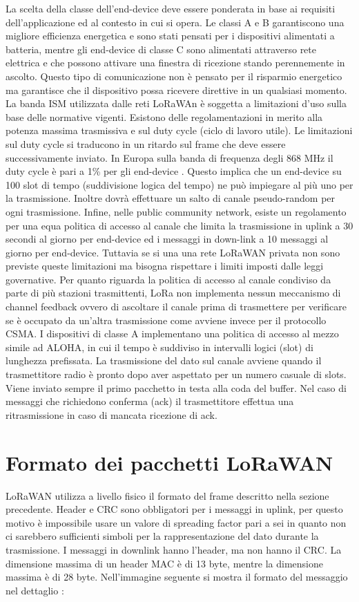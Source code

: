 \documentclass[12pt,a4paper,openright,twoside]{report}
\begin{document}
La scelta della classe dell'end-device deve essere ponderata in base ai requisiti dell'applicazione ed al contesto in cui si opera. Le classi A e B garantiscono una migliore efficienza energetica e sono stati pensati per i dispositivi alimentati a batteria, mentre gli end-device di classe C sono alimentati attraverso rete elettrica e che possono attivare una finestra di ricezione stando perennemente in ascolto. Questo tipo di comunicazione non \`e pensato per il risparmio energetico ma garantisce che il dispositivo possa ricevere direttive in un qualsiasi momento. 
La banda ISM utilizzata dalle reti LoRaWAn \`e soggetta a limitazioni d'uso sulla base delle normative vigenti. Esistono delle regolamentazioni in merito alla potenza massima trasmissiva e sul duty cycle (ciclo di lavoro utile). Le limitazioni sul duty cycle si traducono in un ritardo sul frame che deve essere successivamente inviato. 
In Europa sulla banda di frequenza degli 868 MHz il duty cycle \`e pari a 1\% per gli end-device \cite{K27}.  Questo implica che un end-device su 100 slot di tempo (suddivisione logica del tempo) ne pu\`o impiegare al pi\`u uno per la trasmissione. Inoltre dovr\`a effettuare un salto di canale pseudo-random per ogni trasmissione. Infine, nelle public community network, esiste un regolamento per una equa politica di accesso al canale che limita la trasmissione in uplink a 30 secondi al giorno per end-device ed i messaggi in down-link a 10 messaggi al giorno per end-device. Tuttavia se si una una rete LoRaWAN privata non sono previste queste limitazioni ma bisogna rispettare i limiti imposti dalle leggi governative. 
Per quanto riguarda la politica di accesso al canale condiviso da parte di pi\`u stazioni trasmittenti, LoRa non implementa nessun meccanismo di channel feedback ovvero di ascoltare il canale prima di trasmettere per verificare se \`e occupato da un'altra trasmissione come avviene invece per il protocollo CSMA. I dispositivi di classe A implementano una politica di accesso al mezzo simile ad ALOHA, in cui il tempo \`e suddiviso in intervalli logici (slot) di lunghezza prefissata. La trasmissione del dato sul canale avviene quando il trasmettitore radio \`e pronto dopo aver aspettato per un numero casuale di slots. Viene inviato sempre il primo pacchetto in testa alla coda del buffer. Nel caso di messaggi che richiedono conferma (ack) il trasmettitore effettua una ritrasmissione in caso di mancata ricezione di ack.  

\section{Formato dei pacchetti LoRaWAN}
LoRaWAN utilizza a livello fisico il formato del frame descritto nella sezione precedente. Header e CRC sono obbligatori per i messaggi in uplink, per questo motivo \`e impossibile usare un valore di spreading factor pari a sei in quanto non ci sarebbero sufficienti simboli per la rappresentazione del dato durante la trasmissione. I messaggi in downlink hanno l'header, ma non hanno il CRC. 
La dimensione massima di un header MAC \`e di 13 byte, mentre la dimensione massima \`e di 28 byte.
Nell'immagine seguente si mostra il formato del messaggio nel dettaglio : 
\end{document}
